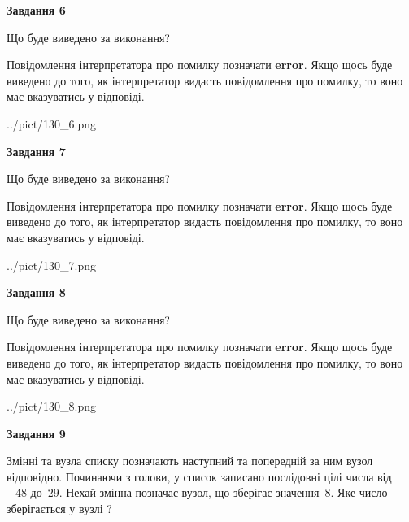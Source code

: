 \documentclass[12pt, ukrainian]{article}
\begin{document}
{\begin {large}
{\begin {center}\textbf{Завдання 6}\end {center}}\par
Що буде виведено за виконання?

Повідомлення інтерпретатора про помилку позначати \textbf{error}.
Якщо щось буде виведено до того, як інтерпретатор видасть повідомлення про помилку, 
то воно має вказуватись у відповіді. \par


\begin{center}
	{../pict/130_6.png}
\end{center}
\newpage

{\begin {center}\textbf{Завдання 7}\end {center}}\par
Що буде виведено за виконання?

Повідомлення інтерпретатора про помилку позначати \textbf{error}.
Якщо щось буде виведено до того, як інтерпретатор видасть повідомлення про помилку, 
то воно має вказуватись у відповіді. \par


\begin{center}
	{../pict/130_7.png}
\end{center}
\newpage

{\begin {center}\textbf{Завдання 8}\end {center}}\par
Що буде виведено за виконання?

Повідомлення інтерпретатора про помилку позначати \textbf{error}.
Якщо щось буде виведено до того, як інтерпретатор видасть повідомлення про помилку, 
то воно має вказуватись у відповіді. \par


\begin{center}
	{../pict/130_8.png}
\end{center}
\newpage

{\begin {center}\textbf{Завдання 9}\end {center}}\par
Змінні  та  вузла списку позначають наступний та попередній за ним вузол відповідно. Починаючи з голови, у список записано послідовні цілі числа від~$-48$ до~$29$. Нехай змінна  позначає вузол, що зберігає значення~$8$.
Яке число зберігається у вузлі  ?\par
\newpage


\end{large}}
\end{document}
